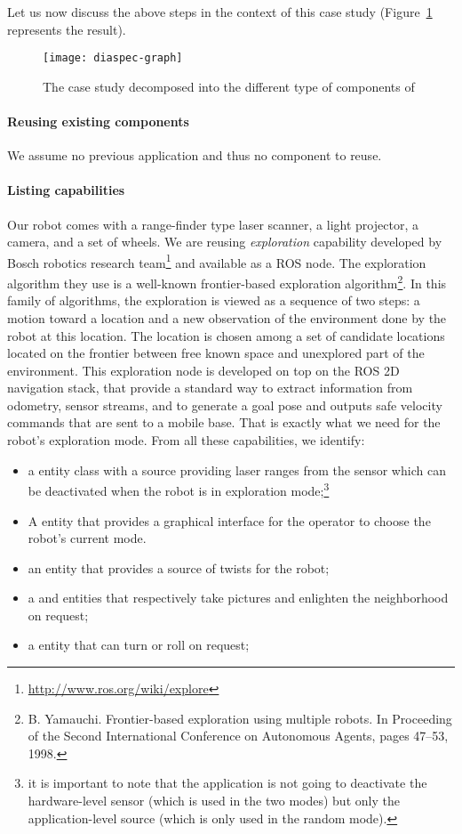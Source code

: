 Let us now discuss the above steps in the context of this case
study (Figure~\ref{fig:diaspec-graph} represents the result).

\begin{figure}
  \centering
  \texttt{[image: diaspec-graph]}
  \caption{The case study decomposed into the different type of
    components of \diaspec{}}
\label{fig:diaspec-graph}
\end{figure}

\paragraph*{Reusing existing components}
We assume no previous \diaspec{} application and thus no \diaspec{}
component to reuse.

\paragraph*{Listing capabilities}
Our robot comes with a range-finder type laser scanner, a light projector, a camera,
and a set of wheels. We are reusing \emph{exploration} capability developed by Bosch robotics research team\footnote{\url{http://www.ros.org/wiki/explore}} and available as a ROS node. The exploration algorithm they use is a well-known frontier-based exploration algorithm\footnote{B. Yamauchi. Frontier-based exploration using multiple robots. In Proceeding of the Second International Conference on Autonomous Agents, pages 47–53, 1998.}. In this family of algorithms, the exploration is viewed as a sequence of two steps: a motion toward a location and a new observation of the environment done by the robot at this location. The location is chosen among a set of candidate locations located on the frontier between free known space and unexplored part of the environment. This exploration node is developed on top on the ROS 2D navigation stack, that provide a standard way to extract information from odometry, sensor streams, and to generate a goal pose and outputs safe velocity commands that are sent to a mobile base. That is exactly what we need for the robot's exploration mode. From all these capabilities, we identify:
\begin{itemize}
\item a  entity class with a  source
  providing laser ranges from the sensor which can be deactivated when
  the robot is in exploration mode;\footnote{it is important to note
    that the application is not going to deactivate the hardware-level
    sensor (which is used in the two modes) but only the
    application-level source (which is only used in the random mode).}
\item A  entity that provides a graphical interface
  for the operator to choose the robot's current mode.
\item an  entity that provides a source of twists for
  the robot;
\item a  and  entities that respectively take
  pictures and enlighten the neighborhood on request;
\item a  entity that can turn or roll on request;
\end{itemize}

